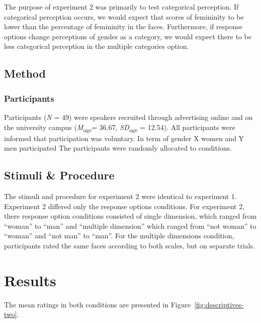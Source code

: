 \documentclass[
  man]{apa7}
\begin{document}
The purpose of experiment 2 was primarily to test categorical perception. If categorical perception occurs, we would expect that scores of femininity to be lower than the percentage of femininity in the faces. Furthermore, if response options change perceptions of gender as a category, we would expect there to be less categorical perception in the multiple categories option.

\hypertarget{method-1}{%
\subsection{Method}\label{method-1}}

\hypertarget{participants-1}{%
\subsubsection{Participants}\label{participants-1}}

Participants (\emph{N} = 49) were speakers recruited through advertising online and on the university campus (\emph{M}\textsubscript{age}= 36.67, \emph{SD}\textsubscript{age} = 12.54). All participants were informed that participation was voluntary. In term of gender X women and Y men participated The participants were randomly allocated to conditions.

\hypertarget{stimuli-procedure}{%
\subsection{Stimuli \& Procedure}\label{stimuli-procedure}}

The stimuli and procedure for experiment 2 were identical to experiment 1. Experiment 2 differed only the response options conditions. For experiment 2, there response option conditions consisted of single dimension, which ranged from ``woman'' to ``man'' and ``multiple dimension'' which ranged from ``not woman'' to ``woman'' and ``not man'' to ``man''. For the multiple dimensions condition, participants rated the same faces according to both scales, but on separate trials.

\hypertarget{results-1}{%
\section{Results}\label{results-1}}

The mean ratings in both conditions are presented in Figure~\ref{fig:descriptives-two}.
\end{document}
